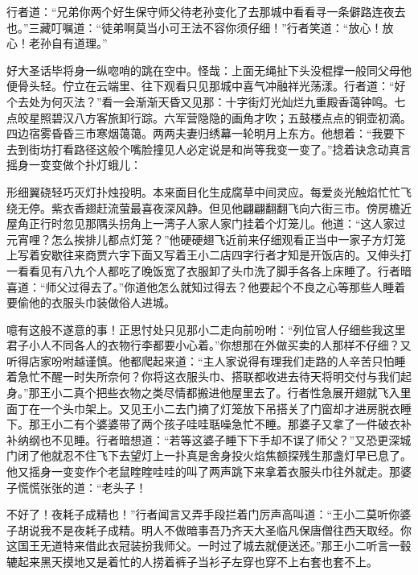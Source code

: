 \documentclass[12pt,UTF8]{ctexbook}
\begin{document}
{	行者道：“兄弟你两个好生保守师父待老孙变化了去那城中看看寻一条僻路连夜去也。”三藏叮嘱道：“徒弟啊莫当小可王法不容你须仔细！”行者笑道：“放心！放心！老孙自有道理。”
	
	好大圣话毕将身一纵唿哨的跳在空中。怪哉：上面无绳扯下头没棍撑一般同父母他便骨头轻。佇立在云端里、往下观看只见那城中喜气冲融祥光荡漾。行者道：“好个去处为何灭法？”看一会渐渐天昏又见那：十字街灯光灿烂九重殿香蔼钟鸣。七点皎星照碧汉八方客旅卸行踪。六军营隐隐的画角才吹；五鼓楼点点的铜壶初滴。四边宿雾昏昏三市寒烟蔼蔼。两两夫妻归绣幕一轮明月上东方。他想着：“我要下去到街坊打看路径这般个嘴脸撞见人必定说是和尚等我变一变了。”捻着诀念动真言摇身一变变做个扑灯蛾儿：
	
	形细翼硗轻巧灭灯扑烛投明。本来面目化生成腐草中间灵应。每爱炎光触焰忙忙飞绕无停。紫衣香翅赶流萤最喜夜深风静。但见他翩翩翻翻飞向六街三市。傍房檐近屋角正行时忽见那隅头拐角上一湾子人家人家门挂着个灯笼儿。他道：“这人家过元宵哩？怎么挨排儿都点灯笼？”他硬硬翅飞近前来仔细观看正当中一家子方灯笼上写着安歇往来商贾六字下面又写着王小二店四字行者才知是开饭店的。又伸头打一看看见有八九个人都吃了晚饭宽了衣服卸了头巾洗了脚手各各上床睡了。行者暗喜道：“师父过得去了。”你道他怎么就知过得去？他要起个不良之心等那些人睡着要偷他的衣服头巾装做俗人进城。
	
	噫有这般不遂意的事！正思忖处只见那小二走向前吩咐：“列位官人仔细些我这里君子小人不同各人的衣物行李都要小心着。”你想那在外做买卖的人那样不仔细？又听得店家吩咐越谨慎。他都爬起来道：“主人家说得有理我们走路的人辛苦只怕睡着急忙不醒一时失所奈何？你将这衣服头巾、搭联都收进去待天将明交付与我们起身。”那王小二真个把些衣物之类尽情都搬进他屋里去了。行者性急展开翅就飞入里面丁在一个头巾架上。又见王小二去门摘了灯笼放下吊搭关了门窗却才进房脱衣睡下。那王小二有个婆婆带了两个孩子哇哇聒噪急忙不睡。那婆子又拿了一件破衣补补纳纲也不见睡。行者暗想道：“若等这婆子睡下下手却不误了师父？”又恐更深城门闭了他就忍不住飞下去望灯上一扑真是舍身投火焰焦额探残生那盏灯早已息了。他又摇身一变变作个老鼠睳睳哇哇的叫了两声跳下来拿着衣服头巾往外就走。那婆子慌慌张张的道：“老头子！
	
	不好了！夜耗子成精也！”行者闻言又弄手段拦着门厉声高叫道：“王小二莫听你婆子胡说我不是夜耗子成精。明人不做暗事吾乃齐天大圣临凡保唐僧往西天取经。你这国王无道特来借此衣冠装扮我师父。一时过了城去就便送还。”那王小二听言一毂辘起来黑天摸地又是着忙的人捞着裤子当衫子左穿也穿不上右套也套不上。
	
}
\end{document}

